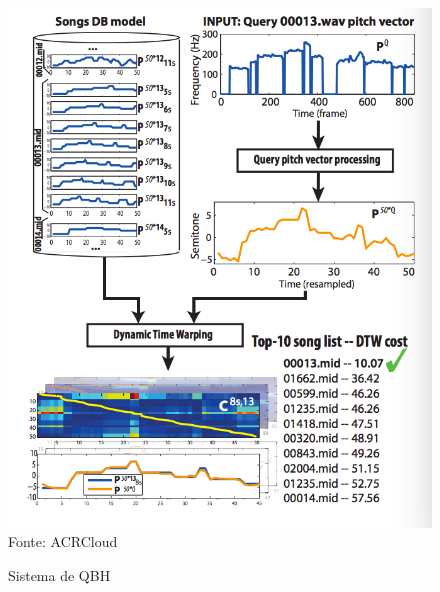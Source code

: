 \begin{figure}[!htb]
   \centering
   \caption{Sistema de QBH}\label{fig:qbhProcesso} 
   \includegraphics[scale=0.95]{figuras/query_by_humming.png}
   \\Fonte: ACRCloud
\end{figure}

